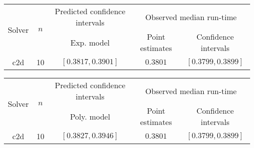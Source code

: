 \begin{tabular}{ccccc}
\hline 
\multirow{2}{*}{Solver} & \multirow{2}{*}{$n$} & Predicted confidence intervals & \multicolumn{2}{c}{Observed median  run-time}\tabularnewline
 &  & Exp. model  & Point estimates  & Confidence intervals\tabularnewline
\hline 
\hline 
\multirow{0}{*}{c2d} & 10 & $\mathbf{\left[0.3817,0.3901\right]}$ & $0.3801$ & $\left[0.3799,0.3899\right]$ \tabularnewline 
\hline 
\end{tabular} 

\begin{tabular}{ccccc}
\hline 
\multirow{2}{*}{Solver} & \multirow{2}{*}{$n$} & Predicted confidence intervals & \multicolumn{2}{c}{Observed median  run-time}\tabularnewline
 &  & Poly. model  & Point estimates  & Confidence intervals\tabularnewline
\hline 
\hline 
\multirow{0}{*}{c2d} & 10 & $\mathbf{\left[0.3827,0.3946\right]}$ & $0.3801$ & $\left[0.3799,0.3899\right]$ \tabularnewline 
\hline 
\end{tabular} 


